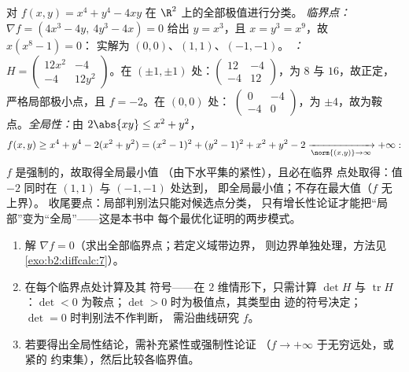 \begin{example}\label{ex:b2:diffcalc:quarticrun}
对 $f(x, y) = x^4 + y^4 - 4xy$ 在 $\R^2$ 上的全部极值进行分类。
\emph{临界点：} $\nabla f = (4x^3 - 4y,\ 4y^3 - 4x) =
0$ 给出 $y = x^3$，且 $x = y^3 = x^9$，故 $x(x^8 - 1) = 0$：
实解为 $(0,0)$、$(1,1)$、$(-1,-1)$。
\emph{：} $H = \begin{pmatrix} 12x^2 & -4\\ -4 &
12y^2\end{pmatrix}$。在 $(\pm1, \pm1)$ 处：$\begin{pmatrix} 12 &
-4\\ -4 & 12\end{pmatrix}$，为 $8$ 与 $16$，故正定，
严格局部极小点，且 $f = -2$。在 $(0,0)$ 处：
$\begin{pmatrix} 0 & -4\\ -4 & 0\end{pmatrix}$，为
$\pm4$，故为鞍点。\emph{全局性：}由 $2\abs{xy} \leq x^2 +
y^2$，
\[
f(x, y) \geq x^4 + y^4 - 2(x^2 + y^2)
= (x^2 - 1)^2 + (y^2 - 1)^2 + x^2 + y^2 - 2
\xrightarrow[\norm{(x,y)}\to\infty]{} +\infty :
\]
$f$ 是强制的，故取得全局最小值
（由下水平集的紧性），且必在临界
点处取得：值 $-2$ 同时在 $(1,1)$ 与 $(-1,-1)$ 处达到，
即全局最小值；不存在最大值（$f$ 无上界）。
收尾要点：局部判别法只能对候选点分类，
只有增长性论证才能把“局部”变为“全局”——这是本书中
每个最优化证明的两步模式。
\end{example}

\begin{method}\label{met:b2:diffcalc:extrema}
\begin{enumerate}
  \item 解 $\nabla f = 0$（求出全部临界点；若定义域带边界，
        则边界单独处理，方法见
        \cref{exo:b2:diffcalc:7}）。
  \item 在每个临界点处计算及其
        符号——在 $2$ 维情形下，只需计算 $\det H$
        与 $\operatorname{tr} H$：$\det < 0$ 为鞍点；$\det >
        0$ 时为极值点，其类型由
        迹的符号决定；$\det = 0$ 时判别法不作判断，
        需沿曲线研究 $f$。
  \item 若要得出全局性结论，需补充紧性或强制性论证
        （$f \to +\infty$ 于无穷远处，或紧的
        约束集），然后比较各临界值。
\end{enumerate}
\end{method}

